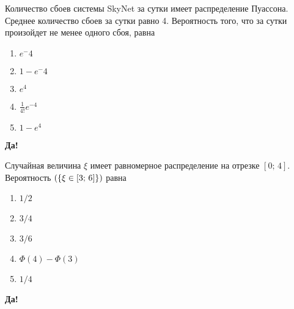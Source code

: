\documentclass[t]{beamer}
\let\P\relax
\DeclareMathOperator{\P}{\mathbb{P}}
\begin{document}
 \begin{frame} \label{28-Yes} 
\begin{block}{28} 

Количество сбоев системы SkyNet за сутки имеет распределение Пуассона. Среднее количество сбоев за сутки равно 4. Вероятность того, что за сутки произойдет не менее одного сбоя, равна
  


 \end{block} 
\begin{enumerate} 
\item[] \hyperlink{28-No}{\beamergotobutton{}  $e^-4$ }
\item[] \hyperlink{28-Yes}{\beamergotobutton{}  $1- e^-4$ }
\item[] \hyperlink{28-No}{\beamergotobutton{}  $e^4$ }
\item[] \hyperlink{28-No}{\beamergotobutton{}  $\tfrac{1}{4!}e^{-4}$}
\item[] \hyperlink{28-No}{\beamergotobutton{}  $1-e^4$ }
\end{enumerate} 

 \textbf{Да!} 
 \hyperlink{29}{}\end{frame} 


 \begin{frame} \label{29-Yes} 
\begin{block}{29} 

Случайная величина $\xi$ имеет равномерное распределение на отрезке $[0;\,4]$. Вероятность $\P(\{\xi \in [3;\,6]\})$ равна
  


 \end{block} 
\begin{enumerate} 
\item[] \hyperlink{29-No}{\beamergotobutton{}  $1/2$ }
\item[] \hyperlink{29-No}{\beamergotobutton{}  $3/4$ }
\item[] \hyperlink{29-No}{\beamergotobutton{}  $3/6$ }
\item[] \hyperlink{29-No}{\beamergotobutton{}  $\Phi(4) - \Phi(3)$  }
\item[] \hyperlink{29-Yes}{\beamergotobutton{}  $1/4$ }
\end{enumerate} 

 \textbf{Да!} 
 \hyperlink{30}{}\end{frame} 
\end{document}
